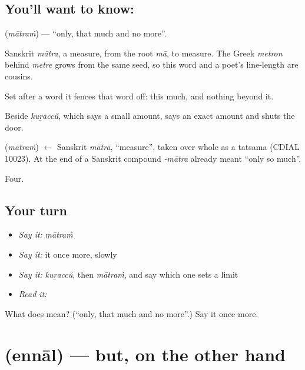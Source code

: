 \subsection*{You'll want to know: }
\textbf{} (\emph{mātraṁ}) — \textquotedblleft{}only, that much and no more\textquotedblright{}.

Sanskrit \emph{mātra}, a measure, from the root \emph{mā}, to measure. The Greek \emph{metron} behind \emph{metre} grows from the same seed, so this word and a poet's line-length are cousins.

Set after a word it fences that word off: this much, and nothing beyond it.

Beside \emph{kuṟaccŭ}, which says a small amount,  says an exact amount and shuts the door.

\begin{cousinweb}
\textbf{} (\emph{mātraṁ}) $\leftarrow$ Sanskrit \emph{mātrā}, \textquotedblleft{}measure\textquotedblright{}, taken over whole as a tatsama (CDIAL 10023). At the end of a Sanskrit compound \emph{-mātra} already meant \textquotedblleft{}only so much\textquotedblright{}.
\end{cousinweb}

\begin{grammarlens}[title={What you've built}]
Four.
\end{grammarlens}

\subsection*{Your turn}
\begin{itemize}
\raggedright
  \item \emph{Say it:} \emph{mātraṁ}
  \item \emph{Say it:} it once more, slowly
  \item \emph{Say it:} \emph{kuṟaccŭ}, then \emph{mātraṁ}, and say which one sets a limit
  \item \emph{Read it:} \textbf{}
\end{itemize}

\begin{tcolorbox}[breakable,colback=teal!4,colframe=teal!35!black,title={Before you move on}]
What does  mean? (\textquotedblleft{}only, that much and no more\textquotedblright{}.) Say it once more.
\end{tcolorbox}
\section[\texorpdfstring{\ml{എന്നാൽ} (ennāl)}{എന്നാൽ (ennāl)}]{ (ennāl) — but, on the other hand}

